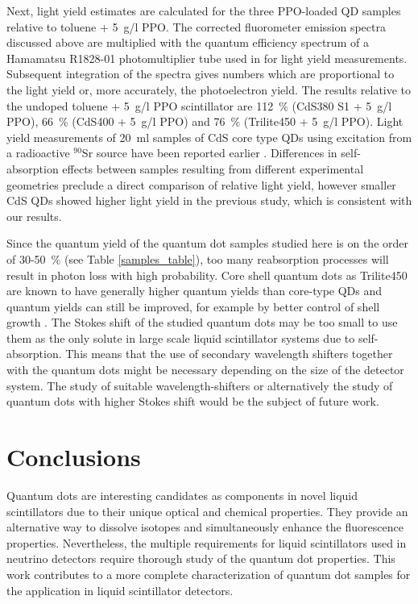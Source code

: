 \documentclass[cits]{JINST}
\begin{document}
Next, light yield estimates are calculated for the three PPO-loaded QD samples relative to toluene + 5~g/l PPO. The corrected fluorometer emission spectra discussed above are multiplied with the quantum efficiency spectrum of a Hamamatsu R1828-01 photomultiplier tube used in \cite{mitpaper} for light yield measurements. Subsequent integration of the spectra gives numbers which are proportional to the light yield or, more accurately, the photoelectron yield. The results relative to the undoped toluene + 5~g/l PPO scintillator are 112~\% (CdS380 S1 + 5~g/l PPO), 66~\% (CdS400 + 5~g/l PPO) and 76~\% (Trilite450 + 5~g/l PPO). Light yield measurements of 20~ml samples of CdS core type QDs using excitation from a radioactive $^{90}$Sr source have been reported earlier \cite{mitpaper}. Differences in self-absorption effects between samples resulting from different experimental geometries preclude a direct comparison of relative light yield, however smaller CdS QDs showed higher light yield in the previous study, which is consistent with our results. 
  
Since the quantum yield of the quantum dot samples studied here is on the order of 30-50~\% (see Table \ref{samples_table}), too many reabsorption processes will result in photon loss with high probability. Core shell quantum dots as Trilite450 are known to have generally higher quantum yields than core-type QDs \cite{swafford2006,dabbousi1997,obrien2011} and quantum yields can still be improved, for example by better control of shell growth \cite{mcbride2006}. The Stokes shift of the studied quantum dots may be too small to use them as the only solute in large scale liquid scintillator systems due to self-absorption. This means that the use of secondary wavelength shifters together with the quantum dots might be necessary depending on the size of the detector system. The study of suitable wavelength-shifters or alternatively the study of quantum dots with higher Stokes shift would be the subject of future work. 

\section{Conclusions}

Quantum dots are interesting candidates as components in novel liquid scintillators due to their unique optical and chemical properties. They provide an alternative way to dissolve isotopes and simultaneously enhance the fluorescence properties. Nevertheless, the multiple requirements for liquid scintillators used in neutrino detectors require thorough study of the quantum dot properties. This work contributes to a more complete characterization of quantum dot samples for the application in liquid scintillator detectors. 
\end{document}

